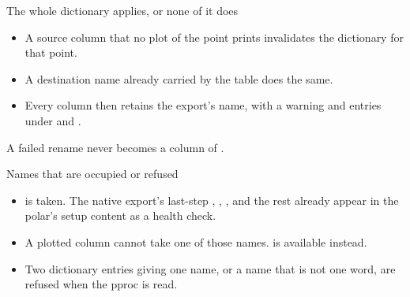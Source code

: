 \begin{frame}{The whole dictionary applies, or none of it does}
\begin{itemize}\small
  \item A source column that no plot of the point prints invalidates the
        dictionary for that point.
  \item A destination name already carried by the table does the same.
  \item Every column then retains the export's name, with a warning and
         entries under 
        and .
\end{itemize}
\begin{takeaway}
A failed rename never becomes a column of .
\end{takeaway}
\end{frame}

\begin{frame}{Names that are occupied or refused}
\begin{itemize}\small
  \item {} is taken. The native export's last-step ,
        , ,  and the rest already appear
        in the polar's setup content as a health check.
  \item A plotted column cannot take one of those names.
         is available instead.
  \item Two dictionary entries giving one name, or a name that is not
        one word, are refused when the pproc is read.
\end{itemize}
\end{frame}

